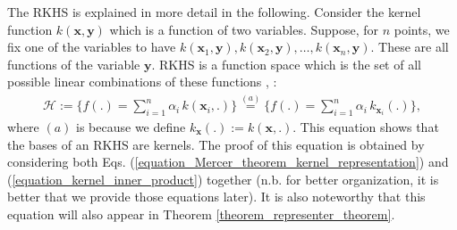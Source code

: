 \documentclass[lang=cn,10pt]{gorgeousnbook}
\numberwithin{equation}{section}%
\numberwithin{figure}{section}%
\begin{document}
The RKHS is explained in more detail in the following. 
Consider the kernel function $k(\boldsymbol{x}, \boldsymbol{y})$ which is a function of two variables. 
Suppose, for $n$ points, we fix one of the variables to have $k(\boldsymbol{x}_1, \boldsymbol{y}), k(\boldsymbol{x}_2, \boldsymbol{y}), \dots, k(\boldsymbol{x}_n, \boldsymbol{y})$.
These are all functions of the variable $\boldsymbol{y}$. 
RKHS is a function space which is the set of all possible linear combinations of these functions \cite{kimeldorf1971some}, \cite{mercer1909functions}:
\begin{align}\label{equation_RKHS}
\mathcal{H} :=\! \Big\{f(.) = \sum_{i=1}^n \alpha_i\, k(\boldsymbol{x}_i, .)\Big\} \!\overset{(a)}{=}\! \Big\{f(.) = \sum_{i=1}^n \alpha_i\, k_{\boldsymbol{x}_i}(.)\Big\},
\end{align}
where $(a)$ is because we define $k_{\boldsymbol{x}}(.) := k(\boldsymbol{x}, .)$.
This equation shows that the bases of an RKHS are kernels.
The proof of this equation is obtained by considering both Eqs. (\ref{equation_Mercer_theorem_kernel_representation}) and (\ref{equation_kernel_inner_product}) together (n.b. for better organization, it is better that we provide those equations later). 
It is also noteworthy that this equation will also appear in Theorem \ref{theorem_representer_theorem}.
\end{document}
